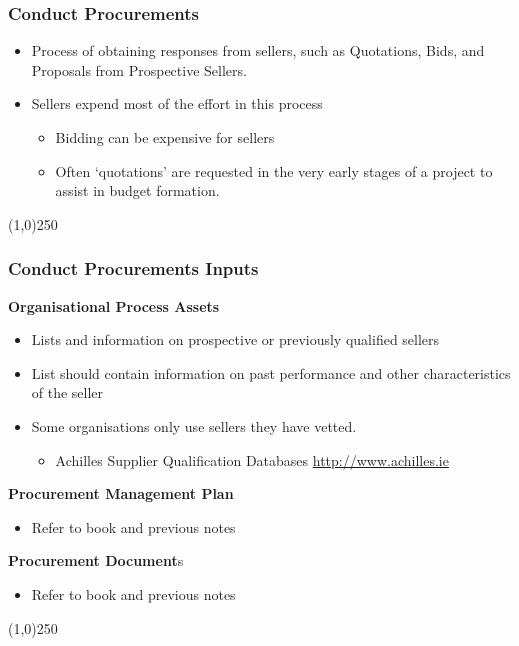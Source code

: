 \begin{frame}
\frametitle{Conduct Procurements}
\begin{itemize}
	\item Process of obtaining responses from sellers, such as Quotations, Bids, and Proposals from Prospective Sellers.
	\item Sellers expend most of the effort in this process
	\begin{itemize}
		\item Bidding can be expensive for sellers
		\item Often `quotations' are requested in the very early stages of a project to assist in budget formation. 
	\end{itemize}
\end{itemize}
\end{frame}\begin{center}\line(1,0){250}\end{center}




\begin{frame}
\frametitle{Conduct Procurements \hfill\hfill Inputs}
\textbf{Organisational Process Assets}
		\begin{itemize}
			\item Lists and information on prospective or previously qualified sellers
			\item List should contain information on past performance and other characteristics of the seller
			\item Some organisations only use sellers they have vetted.
			\begin{itemize}
				\item Achilles Supplier Qualification Databases \href{http://www.achilles.ie}{http://www.achilles.ie}
			\end{itemize}
		\end{itemize}
\textbf{Procurement Management Plan}
\begin{itemize}
	\item Refer to book and previous notes
\end{itemize}
\textbf{Procurement Document}s
	\begin{itemize}
		\item Refer to book and previous notes
	\end{itemize}
\end{frame}\begin{center}\line(1,0){250}\end{center}



